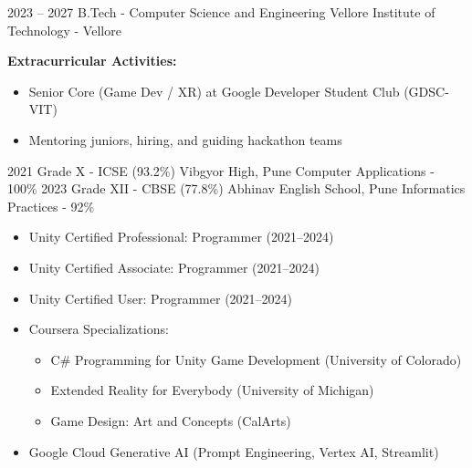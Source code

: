\documentclass[9pt]{developercv}
\newenvironment{tightemize}
{
	\begin{itemize}
		\setlength{\itemsep}{0pt}
		\setlength{\parskip}{0pt}
		\setlength{\parsep}{0pt}     
	}
	{ 
	\end{itemize}                  
}
\begin{document}
	
	\begin{entrylist}
		\entry
		{2023 -- 2027}
		{B.Tech - Computer Science and Engineering}
		{Vellore Institute of Technology - Vellore}
		{
			\textbf{Extracurricular Activities:}
			\begin{itemize}
				\item Senior Core (Game Dev / XR) at Google Developer Student Club (GDSC-VIT)
				\item Mentoring juniors, hiring, and guiding hackathon teams
			\end{itemize}
		}
		\entry
		{2021}
		{Grade X - ICSE (93.2\%)}
		{Vibgyor High, Pune}
		{Computer Applications - 100\%}
		\entry
		{2023}
		{Grade XII - CBSE (77.8\%)}
		{Abhinav English School, Pune}
		{Informatics Practices - 92\%}
	\end{entrylist}
	
	\pagebreak
	
	\begin{itemize}
		\item Unity Certified Professional: Programmer (2021--2024)
		\item Unity Certified Associate: Programmer (2021--2024)
		\item Unity Certified User: Programmer (2021--2024)
		\item Coursera Specializations:
		\begin{tightemize}
			\item C\# Programming for Unity Game Development (University of Colorado)
			\item Extended Reality for Everybody (University of Michigan)
			\item Game Design: Art and Concepts (CalArts)
		\end{tightemize}
		\item Google Cloud Generative AI (Prompt Engineering, Vertex AI, Streamlit)
	\end{itemize}
	
	
\end{document}
